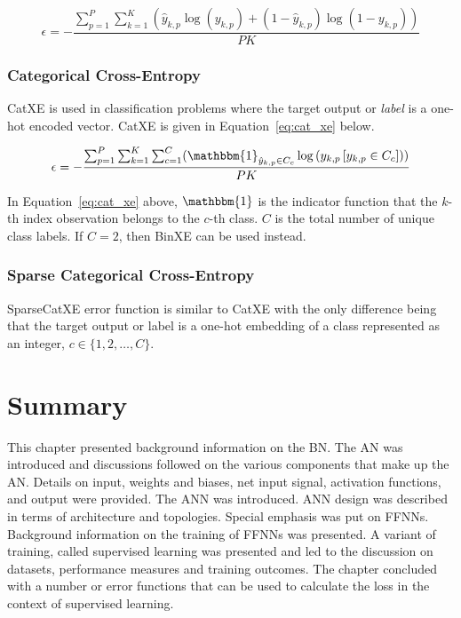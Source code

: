 \begin{equation}
      \epsilon = -\frac{\sum_{p=1}^P \sum_{k=1}^K (\hat{y}_{k,p} \log{(y_{k,p})} + (1 - \hat{y}_{k,p})\log{(1 - y_{k,p})})}{PK}
      \label{eq:bin_xe}
\end{equation}

\noindent

\subsubsection{Categorical Cross-Entropy}\label{sec:anns:training:error_functions:cat_xe}

\acs{CatXE} is used in classification problems where the target output or \textit{label} is a one-hot encoded vector. \acs{CatXE} is given in Equation~\eqref{eq:cat_xe} below.

\begin{equation}
      \epsilon = -\frac{\sum_{p=1}^P \sum_{k=1}^K \sum_{c=1}^C (\mathbbm{1}_{\hat{y}_{k,p} \in C_c} \log{(y_{k,p} \left[ y_{k,p} \in C_c \right])})}{PK}
      \label{eq:cat_xe}
\end{equation}

\noindent
In Equation~\eqref{eq:cat_xe} above, $\mathbbm{1}$ is the indicator function that the $k$-th index observation belongs to the $c$-th class. $C$ is the total number of unique class labels. If $C = 2$, then \acs{BinXE} can be used instead.

\subsubsection{Sparse Categorical Cross-Entropy}\label{sec:anns:training:error_functions:sparse_cat_xe}

\acs{SparseCatXE} error function is similar to \acs{CatXE} with the only difference being that the target output or label is a one-hot embedding of a class represented as an integer, $c \in \{1,2, \dots, C\}$.


\section{Summary}\label{sec:anns:summary}

This chapter presented background information on the \acs{BN}. The \acs{AN} was introduced and discussions followed on the various components that make up the \acs{AN}. Details on input, weights and biases, net input signal, activation functions, and output were provided. The \acs{ANN} was introduced. \acs{ANN} design was described in terms of architecture and topologies. Special emphasis was put on \acp{FFNN}. Background information on the training of \acp{FFNN} was presented. A variant of training, called supervised learning was presented and led to the discussion on datasets, performance measures and training outcomes. The chapter concluded with a number or error functions that can be used to calculate the loss in the context of supervised learning.
